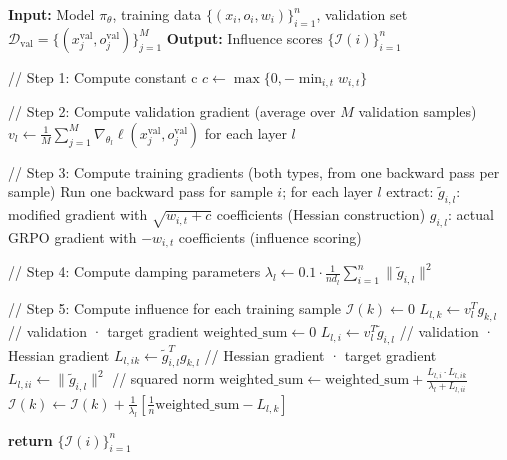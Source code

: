 \documentclass{article}
\begin{document}
\begin{algorithm}[H]
\caption{Influence Computation for Linearized GRPO with DataInf}
\begin{algorithmic}[1]
\STATE \textbf{Input:} Model $\pi_\theta$, training data $\{(x_i, o_i, w_i)\}_{i=1}^n$, validation set $\mathcal{D}_{\mathrm{val}} = \{(x_j^{\mathrm{val}}, o_j^{\mathrm{val}})\}_{j=1}^M$
\STATE \textbf{Output:} Influence scores $\{\mathcal{I}(i)\}_{i=1}^n$

\STATE // Step 1: Compute constant c
\STATE $c \leftarrow \max\{0, -\min_{i,t} w_{i,t}\}$

\STATE // Step 2: Compute validation gradient (average over $M$ validation samples)
\STATE $v_l \leftarrow \frac{1}{M}\sum_{j=1}^{M}\nabla_{\theta_l} \ell(x_j^{\mathrm{val}}, o_j^{\mathrm{val}})$ for each layer $l$

\STATE // Step 3: Compute training gradients (both types, from one backward pass per sample)
    \STATE Run one backward pass for sample $i$; for each layer $l$ extract:
    \STATE \hspace{1em} $\tilde{g}_{i,l}$: modified gradient with $\sqrt{w_{i,t}+c}$ coefficients \hspace{1em} (Hessian construction)
    \STATE \hspace{1em} $g_{i,l}$: actual GRPO gradient with $-w_{i,t}$ coefficients \hspace{2.1em} (influence scoring)
\ENDFOR

\STATE // Step 4: Compute damping parameters
    \STATE $\lambda_l \leftarrow 0.1 \cdot \frac{1}{n d_l}\sum_{i=1}^n \|\tilde{g}_{i,l}\|^2$
\ENDFOR

\STATE // Step 5: Compute influence for each training sample
    \STATE $\mathcal{I}(k) \leftarrow 0$
        \STATE $L_{l,k} \leftarrow v_l^T g_{k,l}$ \quad // validation · target gradient
        \STATE $\text{weighted\_sum} \leftarrow 0$
            \STATE $L_{l,i} \leftarrow v_l^T \tilde{g}_{i,l}$ \quad // validation · Hessian gradient
            \STATE $L_{l,ik} \leftarrow \tilde{g}_{i,l}^T g_{k,l}$ \quad // Hessian gradient · target gradient
            \STATE $L_{l,ii} \leftarrow \|\tilde{g}_{i,l}\|^2$ \quad // squared norm
            \STATE $\text{weighted\_sum} \leftarrow \text{weighted\_sum} + \frac{L_{l,i} \cdot L_{l,ik}}{\lambda_l + L_{l,ii}}$
        \ENDFOR
        \STATE $\mathcal{I}(k) \leftarrow \mathcal{I}(k) + \frac{1}{\lambda_l}\left[\frac{1}{n}\text{weighted\_sum} - L_{l,k}\right]$
    \ENDFOR
\ENDFOR

\STATE \textbf{return} $\{\mathcal{I}(i)\}_{i=1}^n$
\end{algorithmic}
\end{algorithm}
\end{document}

